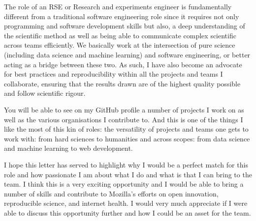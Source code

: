 \documentclass[11pt, a4paper]{awesome-cv} %
\begin{document}
\begin{cvletter}
The role of an RSE or Research and experiments engineer is fundamentally different from a traditional software engineering role since it requires not only programming and software development skills but also, a deep understanding of the scientific method as well as being able to communicate complex scientific across teams efficiently. We basically work at the intersection of pure science (including data science and machine learning) and software engineering, or better acting as a bridge between these two.  As such, I have also become an advocate for best practices and reproducibility within all the projects and teams I collaborate, ensuring that the results drawn are of the highest quality possible and follow scientific rigour. 

You will be able to see on my GitHub profile a number of projects I work on as well as the various organisations I contribute to. And this is one of the things I like the most of this kin  of roles: the versatility of projects and teams one gets to work with: from hard sciences to humanities and across scopes: from data science and machine learning to web development. 

I hope this letter has served to highlight why I would be a perfect match for this role and how passionate I am about what I do and what is that I can bring to the team. I think this is a very exciting opportunity and I would be able to bring a number of skills and contribute to Mozilla's efforts on open innovation, reproducible science, and internet health.  I  would very much appreciate if I were able to discuss this opportunity further and how I could be an asset for the team.

\end{cvletter}


\makeletterclosing %
\end{document}
